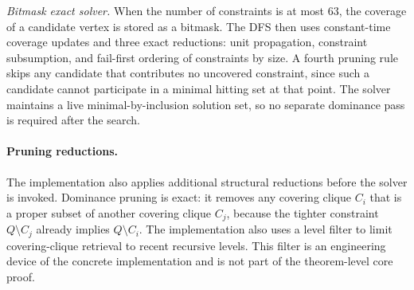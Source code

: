 \documentclass[sigconf, nonacm]{acmart}
\theoremstyle{definition}
\theoremstyle{remark}
\begin{document}
\textit{Bitmask exact solver.}  When the number of constraints is at most $63$,
the coverage of a candidate vertex is stored as a bitmask.  The DFS then uses
constant-time coverage updates and three exact reductions: unit propagation,
constraint subsumption, and fail-first ordering of constraints by size.  A
fourth pruning rule skips any candidate that contributes no uncovered
constraint, since such a candidate cannot participate in a minimal hitting set
at that point.  The solver maintains a live minimal-by-inclusion solution set,
so no separate dominance pass is required after the search.

\paragraph{Pruning reductions.}
The implementation also applies additional structural reductions before the
solver is invoked.  Dominance pruning is exact: it removes any covering clique
$C_i$ that is a proper subset of another covering clique $C_j$, because the
tighter constraint $Q \setminus C_j$ already implies $Q \setminus C_i$.  The
implementation also uses a level filter to limit covering-clique retrieval to
recent recursive levels.  This filter is an engineering device of the concrete
implementation and is not part of the theorem-level core proof.



\end{document}

